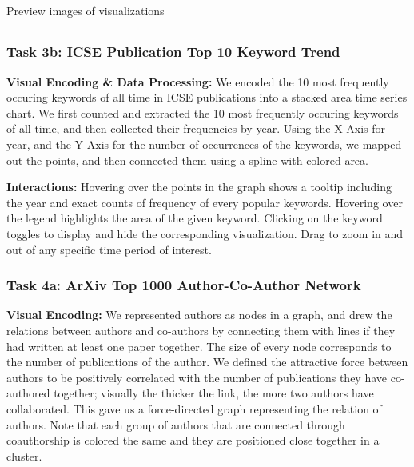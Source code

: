 \documentclass{article}
\begin{document}
\subsection{}

Preview images of visualizations







\subsection{}

\subsubsection*{Task 3b: ICSE Publication Top 10 Keyword Trend}


\textbf{Visual Encoding \& Data Processing:} We encoded the 10 most frequently occuring keywords of all time in ICSE publications into a stacked area time series chart. We first counted and extracted the 10 most frequently occuring keywords of all time, and then collected their frequencies by year. Using the X-Axis for year, and the Y-Axis for the number of occurrences of the keywords, we mapped out the points, and then connected them using a spline with colored area.

\textbf{Interactions:} Hovering over the points in the graph shows a tooltip including the year and exact counts of frequency of every popular keywords. Hovering over the legend highlights the area of the given keyword. Clicking on the keyword toggles to display and hide the corresponding visualization. Drag to zoom in and out of any specific time period of interest.

\subsubsection*{Task 4a: ArXiv Top 1000 Author-Co-Author Network}

\textbf{Visual Encoding:} We represented authors as nodes in a graph, and drew the relations between authors and co-authors by connecting them with lines if they had written at least one paper together. The size of every node corresponds to the number of publications of the author. We defined the attractive force between authors to be positively correlated with the number of publications they have co-authored together; visually the thicker the link, the more two authors have collaborated. This gave us a force-directed graph representing the relation of authors. Note that each group of authors that are connected through coauthorship is colored the same and they are positioned close together in a cluster. 
\end{document}
